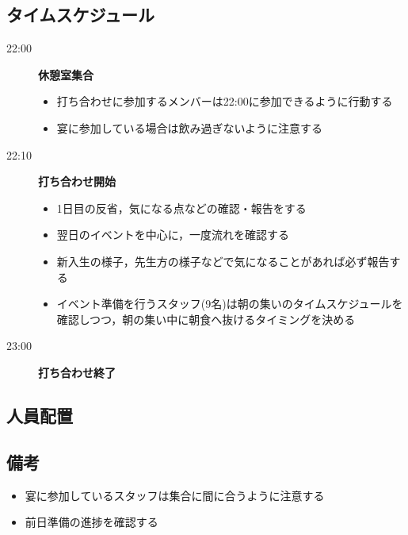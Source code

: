 \subsection{タイムスケジュール}
\begin{description}
  \item[22:00] \textbf{休憩室集合}
  \begin{itemize}
    \item 打ち合わせに参加するメンバーは22:00に参加できるように行動する
    \item 宴に参加している場合は飲み過ぎないように注意する
  \end{itemize}

  \item[22:10] \textbf{打ち合わせ開始}
  \begin{itemize}
    \item 1日目の反省，気になる点などの確認・報告をする
    \item 翌日のイベントを中心に，一度流れを確認する
    \item 新入生の様子，先生方の様子などで気になることがあれば必ず報告する
    \item イベント準備を行うスタッフ(9名)は朝の集いのタイムスケジュールを確認しつつ，朝の集い中に朝食へ抜けるタイミングを決める
  \end{itemize}

  \item[23:00] \textbf{打ち合わせ終了}
\end{description}

\subsection{人員配置}


\subsection{備考}
\begin{itemize}
  \item 宴に参加しているスタッフは集合に間に合うように注意する
  \item 前日準備の進捗を確認する
\end{itemize}